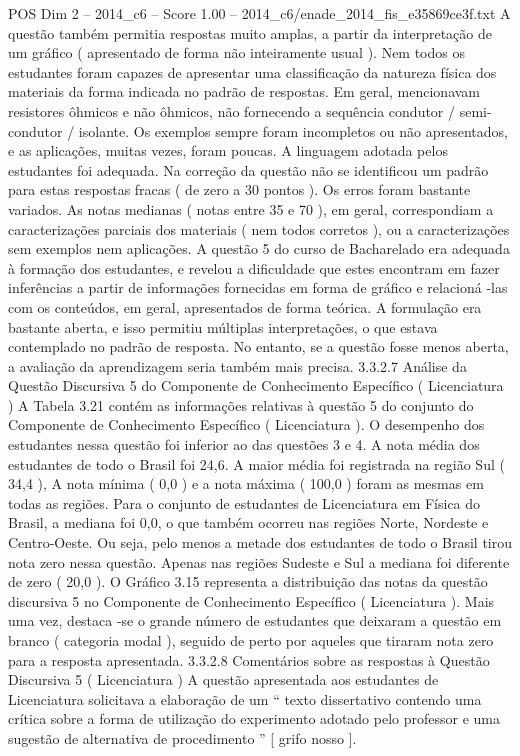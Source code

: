 \begin{textsample}{POS Dim 2 – 2014\_c6 – Score 1.00 – 2014\_c6/enade\_2014\_fis\_e35869ce3f.txt}
A questão também permitia respostas muito amplas, a partir da interpretação de um gráfico ( apresentado de forma não inteiramente usual ).
Nem todos os estudantes foram capazes de apresentar uma classificação da natureza física dos materiais da forma indicada no padrão de respostas.
Em geral, mencionavam resistores ôhmicos e não ôhmicos, não fornecendo a sequência condutor / semi-condutor / isolante.
Os exemplos sempre foram incompletos ou não apresentados, e as aplicações, muitas vezes, foram poucas.
A linguagem adotada pelos estudantes foi adequada.
Na correção da questão não se identificou um padrão para estas respostas fracas ( de zero a 30 pontos ).
Os erros foram bastante variados.
As notas medianas ( notas entre 35 e 70 ), em geral, correspondiam a caracterizações parciais dos materiais ( nem todos corretos ), ou a caracterizações sem exemplos nem aplicações.
A questão 5 do curso de Bacharelado era adequada à formação dos estudantes, e revelou a dificuldade que estes encontram em fazer inferências a partir de informações fornecidas em forma de gráfico e relacioná -las com os conteúdos, em geral, apresentados de forma teórica.
A formulação era bastante aberta, e isso permitiu múltiplas interpretações, o que estava contemplado no padrão de resposta.
No entanto, se a questão fosse menos aberta, a avaliação da aprendizagem seria também mais precisa. 3.3.2.7 Análise da Questão Discursiva 5 do Componente de Conhecimento Específico ( Licenciatura ) A Tabela 3.21 contém as informações relativas à questão 5 do conjunto do Componente de Conhecimento Específico ( Licenciatura ).
O desempenho dos estudantes nessa questão foi inferior ao das questões 3 e 4.
A nota média dos estudantes de todo o Brasil foi 24,6.
A maior média foi registrada na região Sul ( 34,4 ), A nota mínima ( 0,0 ) e a nota máxima ( 100,0 ) foram as mesmas em todas as regiões.
Para o conjunto de estudantes de Licenciatura em Física do Brasil, a mediana foi 0,0, o que também ocorreu nas regiões Norte, Nordeste e Centro-Oeste.
Ou seja, pelo menos a metade dos estudantes de todo o Brasil tirou nota zero nessa questão.
Apenas nas regiões Sudeste e Sul a mediana foi diferente de zero ( 20,0 ).
O Gráfico 3.15 representa a distribuição das notas da questão discursiva 5 no Componente de Conhecimento Específico ( Licenciatura ).
Mais uma vez, destaca -se o grande número de estudantes que deixaram a questão em branco ( categoria modal ), seguido de perto por aqueles que tiraram nota zero para a resposta apresentada. 3.3.2.8 Comentários sobre as respostas à Questão Discursiva 5 ( Licenciatura ) A questão apresentada aos estudantes de Licenciatura solicitava a elaboração de um “ texto dissertativo contendo uma crítica sobre a forma de utilização do experimento adotado pelo professor e uma sugestão de alternativa de procedimento ” [ grifo nosso ].

\end{textsample}
